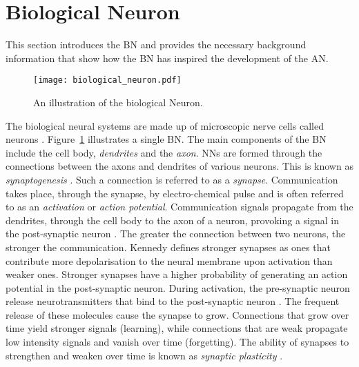\section{Biological Neuron}\label{sec:anns:bn}

This section introduces the \acs{BN} and provides the necessary background information that show how the \acs{BN} has inspired the development of the \acs{AN}.

\begin{figure}[htpb]
    \centering
    \texttt{[image: biological\_neuron.pdf]}
    \caption[The biological Neuron]{An illustration of the biological Neuron.}
    \label{fig:biological_neuron}
\end{figure}

\noindent
The biological neural systems are made up of microscopic nerve cells called neurons \cite{ref:jain:1996}. Figure~\ref{fig:biological_neuron} illustrates a single \acs{BN}. The main components of the \acs{BN} include the cell body, \textit{dendrites} and the \textit{axon}. \Acp{NN} are formed through the connections between the axons and dendrites of various neurons. This is known as \textit{synaptogenesis} \cite{ref:huttenlocher:1997}. Such a connection is referred to as a \textit{synapse}. Communication takes place, through the synapse, by electro-chemical pulse and is often referred to as an \textit{activation} or \textit{action potential}.  Communication signals propagate from the dendrites, through the cell body to the axon of a neuron, provoking a signal in the post-synaptic neuron \cite{ref:engelbrecht:2007}. The greater the connection between two neurons, the stronger the communication.  Kennedy \cite{ref:kennedy:2016} defines stronger synapses as ones that contribute more depolarisation to the neural membrane upon activation than weaker ones. Stronger synapses have a higher probability of generating an action potential in the post-synaptic neuron. During activation, the pre-synaptic neuron release neurotransmitters that bind to the post-synaptic neuron \cite{ref:khanacademy:synapse}. The frequent release of these molecules cause the synapse to grow. Connections that grow over time yield stronger signals (learning), while connections that are weak propagate low intensity signals and vanish over time (forgetting). The ability of synapses to strengthen and weaken over time is known as \textit{synaptic plasticity} \cite{ref:huttenlocher:1997}.

